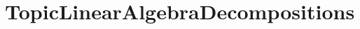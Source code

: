 \hypertarget{group___topic_linear_algebra_decompositions}{}\section{Topic\+Linear\+Algebra\+Decompositions}
\label{group___topic_linear_algebra_decompositions}
